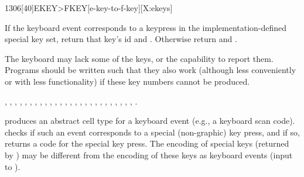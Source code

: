 \begin{worddef}[EKEYtoFKEY]{1306}[40]{EKEY>FKEY}[e-key-to-f-key][X:ekeys]
\item {}

	If the keyboard event  corresponds to a keypress in the
	implementation-defined special key set, return that key's id
	 and . Otherwise return  and
	.

\note
	The keyboard may lack some of the keys, or the capability to report
	them. Programs should be written such that they also work (although
	less conveniently or with less functionality) if these key numbers
	cannot be produced.

\see
	,
	,
	, \linebreak
	,
	,
	, \linebreak
	,
	,
	, \linebreak
	,
	,
	, \linebreak
	,
	,
	, \linebreak
	,
	,
	, \linebreak
	,
	,
	, \linebreak
	,
	,
	, \linebreak
	,
	, \linebreak
	.


	\begin{rationale} %


		 produces an abstract cell type for a keyboard
		event (e.g., a keyboard scan code).   checks
		if such an event corresponds to a special (non-graphic) key
		press, and if so, returns a code for the special key press.
		The encoding of special keys (returned by )
		may be different from the encoding of these keys as keyboard
		events (input to ).


\end{rationale}
\end{worddef}

